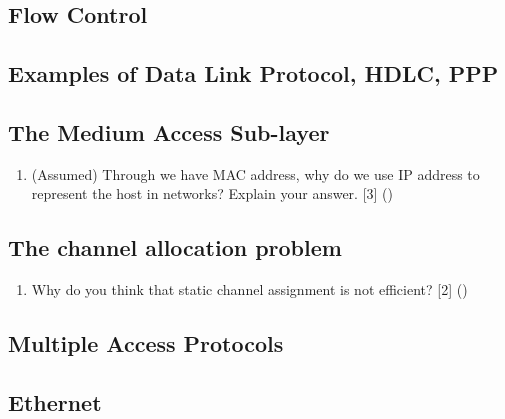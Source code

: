 \documentclass[12pt]{article}
\begin{document}
\subsection{Flow Control}
\subsection{Examples of Data Link Protocol, HDLC, PPP}
\subsection{The Medium Access Sub-layer}
\begin{enumerate}[noitemsep, topsep=0pt]
	\item (Assumed) Through we have MAC address, why do we use IP address to represent the host in networks? Explain your answer. \hfill [3] ()
\end{enumerate}
\subsection{The channel allocation problem}
\begin{enumerate}[noitemsep, topsep=0pt]
	\item Why do you think that static channel assignment is not efficient? \hfill [2] () 
\end{enumerate}
\subsection{Multiple Access Protocols}
\subsection{Ethernet}
\end{document}
